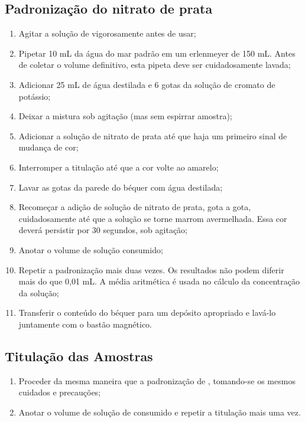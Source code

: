 \documentclass[a4paper,10pt]{SelfArx}
\begin{document}
\subsection{Padronização do nitrato de prata}
\begin{enumerate}[noitemsep]
\item Agitar a solução de  vigorosamente antes de usar;
\item Pipetar 10 mL da água do mar padrão em um erlenmeyer de 150 mL.  Antes de coletar o volume definitivo, esta pipeta deve ser cuidadosamente lavada;
\item Adicionar 25 mL de água destilada e 6 gotas da solução de cromato de potássio;
\item Deixar a mistura sob agitação (mas sem espirrar a\-mo\-stra);
\item Adicionar a solução de nitrato de prata até que haja um primeiro sinal de mudança de cor;
\item Interromper a titulação até que a cor volte ao amarelo;
\item Lavar as gotas da parede do béquer com água destilada;
\item Recomeçar a adição de solução de nitrato de prata, gota a gota, cuidadosamente até que a solução se torne marrom avermelhada. Essa cor deverá persistir por 30 segundos, sob agitação;
\item Anotar o volume de solução consumido;
\item Repetir a padronização mais duas vezes. Os resultados não podem diferir mais do que 0,01 mL. A média aritmética é usada no cálculo da concentração da so\-lu\-ção;
\item Transferir o conteúdo do béquer para um depósito apropriado e lavá-lo juntamente com o bastão magnético.
\end{enumerate}

\subsection{Titulação das Amostras}
\begin{enumerate}[noitemsep]
 \item Proceder da mesma maneira que a padronização de , tomando-se os mesmos cuidados e precauções;
 \item Anotar o volume de solução de  consumido e repetir a titulação mais uma vez.
\end{enumerate}
\end{document}
